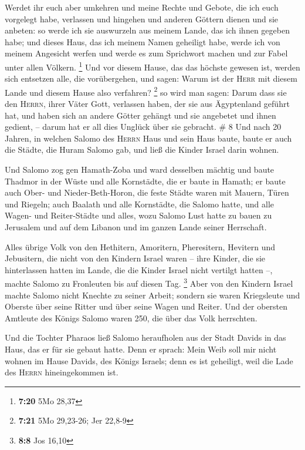  Werdet ihr euch aber umkehren und meine Rechte und
Gebote, die ich euch vorgelegt habe, verlassen und hingehen und anderen
Göttern dienen und sie anbeten:  so werde ich sie
auswurzeln aus meinem Lande, das ich ihnen gegeben habe; und dieses
Haus, das ich meinem Namen geheiligt habe, werde ich von meinem
Angesicht werfen und werde es zum Sprichwort machen und zur Fabel unter
allen Völkern. \footnote{\textbf{7:20} 5Mo 28,37}  Und
vor diesem Hause, das das höchste gewesen ist, werden sich entsetzen
alle, die vorübergehen, und sagen: Warum ist der \textsc{Herr} mit
diesem Lande und diesem Hause also verfahren? \footnote{\textbf{7:21}
  5Mo 29,23-26; Jer 22,8-9}  so wird man sagen: Darum
dass sie den \textsc{Herrn}, ihrer Väter Gott, verlassen haben, der sie
aus Ägyptenland geführt hat, und haben sich an andere Götter gehängt und
sie angebetet und ihnen gedient, -- darum hat er all dies Unglück über
sie gebracht. \# 8  Und nach 20 Jahren, in welchen Salomo
des \textsc{Herrn} Haus und sein Haus baute,  baute er
auch die Städte, die Huram Salomo gab, und ließ die Kinder Israel darin
wohnen.

 Und Salomo zog gen Hamath-Zoba und ward desselben mächtig
 und baute Thadmor in der Wüste und alle Kornstädte, die
er baute in Hamath;  er baute auch Ober- und
Nieder-Beth-Horon, die feste Städte waren mit Mauern, Türen und Riegeln;
 auch Baalath und alle Kornstädte, die Salomo hatte, und
alle Wagen- und Reiter-Städte und alles, wozu Salomo Lust hatte zu bauen
zu Jerusalem und auf dem Libanon und im ganzen Lande seiner Herrschaft.

 Alles übrige Volk von den Hethitern, Amoritern,
Pheresitern, Hevitern und Jebusitern, die nicht von den Kindern Israel
waren --  ihre Kinder, die sie hinterlassen hatten im
Lande, die die Kinder Israel nicht vertilgt hatten --, machte Salomo zu
Fronleuten bis auf diesen Tag. \footnote{\textbf{8:8} Jos 16,10}
 Aber von den Kindern Israel machte Salomo nicht Knechte
zu seiner Arbeit; sondern sie waren Kriegsleute und Oberste über seine
Ritter und über seine Wagen und Reiter.  Und der obersten
Amtleute des Königs Salomo waren 250, die über das Volk herrschten.

 Und die Tochter Pharaos ließ Salomo heraufholen aus der
Stadt Davids in das Haus, das er für sie gebaut hatte. Denn er sprach:
Mein Weib soll mir nicht wohnen im Hause Davids, des Königs Israels;
denn es ist geheiligt, weil die Lade des \textsc{Herrn} hineingekommen
ist.


